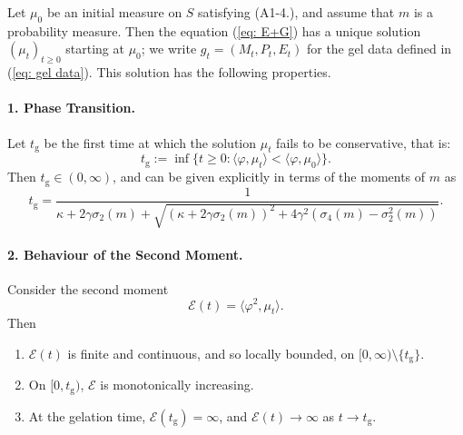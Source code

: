 \begin{theorem}\label{thrm: Smoluchowski equation}
Let $\mu_0$ be an initial measure on $S$ satisfying ({A1-4}.), and assume that $m$ is a probability measure. Then the equation (\ref{eq: E+G}) has a unique solution $(\mu_t)_{t\geq 0}$ starting at $\mu_0$; we write $g_t=(M_t, P_t, E_t)$ for the gel data defined in (\ref{eq: gel data}). This solution has the following properties.
\paragraph{1. Phase Transition.} Let $t_\mathrm{g}$ be the first time at which the solution $\mu_t$ fails to be conservative, that is:
\begin{equation} t_\mathrm{g}:=\inf\{t\ge 0: \langle \varphi, \mu_t\rangle < \langle \varphi, \mu_0\rangle \}.
\end{equation}
Then
$t_\mathrm{g}\in (0,\infty)$, and can be given explicitly in terms of the moments of $m$ as \begin{equation}\label{eq: closed form for tg}
       t_\mathrm{g}= \frac{1}{\kappa +2\gamma\sigma_2(m) + \sqrt{(\kappa+2\gamma\sigma_2(m))^2+4\gamma^2(\sigma_4(m)-\sigma_2^2(m))}}.
   \end{equation}

\paragraph{2. Behaviour of the Second Moment.} Consider the second moment
\begin{equation} \mathcal{E}(t)=\langle \varphi^2, \mu_t\rangle.
\end{equation}
Then \begin{enumerate}[label=\roman{*}).]
    \item $\mathcal{E}(t)$ is finite and continuous, and so locally bounded, on $[0, \infty)\setminus\{t_\mathrm{g}\}.$ 

    \item On $[0, t_\mathrm{g})$, $\mathcal{E}$ is monotonically increasing.
    
    \item At the gelation time, $\mathcal{E}(t_\mathrm{g})=\infty$, and $\mathcal{E}(t)\rightarrow \infty$ as $t\rightarrow t_\mathrm{g}.$ 
\end{enumerate}



\end{theorem}
